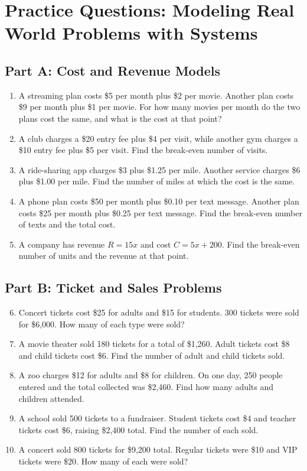 \documentclass[12pt]{article}
\begin{document}
\section*{Practice Questions: Modeling Real World Problems with Systems}

\subsection*{Part A: Cost and Revenue Models}
\begin{enumerate}
  \item A streaming plan costs \$5 per month plus \$2 per movie. Another plan costs \$9 per month plus \$1 per movie. For how many movies per month do the two plans cost the same, and what is the cost at that point?
  \item A club charges a \$20 entry fee plus \$4 per visit, while another gym charges a \$10 entry fee plus \$5 per visit. Find the break-even number of visits.
  \item A ride-sharing app charges \$3 plus \$1.25 per mile. Another service charges \$6 plus \$1.00 per mile. Find the number of miles at which the cost is the same.
  \item A phone plan costs \$50 per month plus \$0.10 per text message. Another plan costs \$25 per month plus \$0.25 per text message. Find the break-even number of texts and the total cost.
  \item A company has revenue \(R = 15x\) and cost \(C = 5x + 200\). Find the break-even number of units and the revenue at that point.
\end{enumerate}

\subsection*{Part B: Ticket and Sales Problems}
\begin{enumerate}
  \setcounter{enumi}{5}
  \item Concert tickets cost \$25 for adults and \$15 for students. 300 tickets were sold for \$6,000. How many of each type were sold?
  \item A movie theater sold 180 tickets for a total of \$1,260. Adult tickets cost \$8 and child tickets cost \$6. Find the number of adult and child tickets sold.
  \item A zoo charges \$12 for adults and \$8 for children. On one day, 250 people entered and the total collected was \$2,460. Find how many adults and children attended.
  \item A school sold 500 tickets to a fundraiser. Student tickets cost \$4 and teacher tickets cost \$6, raising \$2,400 total. Find the number of each sold.
  \item A concert sold 800 tickets for \$9,200 total. Regular tickets were \$10 and VIP tickets were \$20. How many of each were sold?
\end{enumerate}
\end{document}
